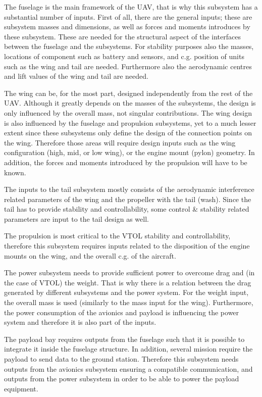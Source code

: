 
The fuselage is the main framework of the UAV, that is why this subsystem has a substantial number of inputs. First of all, there are the general inputs; these are subsystem masses and dimensions, as well as forces and moments introduces by these subsystem. These are needed for the structural aspect of the interfaces between the fuselage and the subsystems. For stability purposes also the masses, locations of component such as battery and sensors, and c.g. position of units such as the wing and tail are needed. Furthermore also the aerodynamic centres and lift values of the wing and tail are needed.  

The wing can be, for the most part, designed independently from the rest of the UAV. Although it greatly depends on the masses of the subsystems, the design is only influenced by the overall mass, not singular contributions. The wing design is also influenced by the fuselage and propulsion subsystems, yet to a much lesser extent since these subsystems only define the design of the connection points on the wing. Therefore those areas will require design inputs such as the wing configuration (high, mid, or low wing), or the  engine mount (pylon) geometry. In addition, the forces and moments introduced by the propulsion will have to be known.

The inputs to the tail subsystem mostly consists of the aerodynamic interference related parameters of the wing and the propeller with the tail (wash). Since the tail has to provide stability and controllability, some control \& stability related parameters are input to the tail design as well.

The propulsion is most critical to the VTOL stability and controllability, therefore this subsystem requires inputs related to the disposition of the engine mounts on the wing, and the overall c.g. of the aircraft.

The power subsystem needs to provide sufficient power to overcome drag and (in the case of VTOL) the weight. That is why there is a relation between the drag generated by different subsystems and the power system. For the weight input, the overall mass is used (similarly to the mass input for the wing). Furthermore, the power consumption of the avionics and payload is influencing the power system and therefore it is also part of the inputs.

The payload bay requires outputs from the fuselage such that it is possible to integrate it inside the fuselage structure. In addition, several mission require the payload to send data to the ground station. Therefore this subsystem needs outputs from the avionics subsystem ensuring a compatible communication, and outputs from the power subsystem in order to be able to power the payload equipment.

